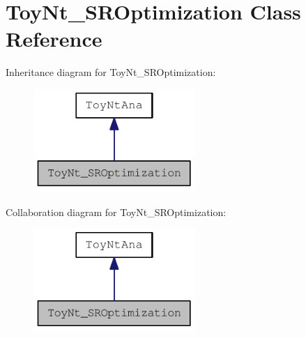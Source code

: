 \hypertarget{classToyNt__SROptimization}{
\section{ToyNt\_\-SROptimization Class Reference}
\label{classToyNt__SROptimization}
}
Inheritance diagram for ToyNt\_\-SROptimization:\nopagebreak
\begin{figure}[H]
\begin{center}
\leavevmode
\includegraphics[width=174pt]{classToyNt__SROptimization__inherit__graph}
\end{center}
\end{figure}
Collaboration diagram for ToyNt\_\-SROptimization:\nopagebreak
\begin{figure}[H]
\begin{center}
\leavevmode
\includegraphics[width=174pt]{classToyNt__SROptimization__coll__graph}
\end{center}
\end{figure}
